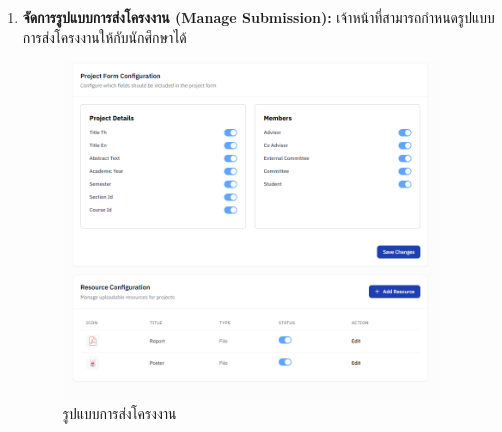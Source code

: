 \begin{itemize}
\begin{enumerate}
    \newpage
    \item \textbf{จัดการรูปแบบการส่งโครงงาน (Manage Submission): } เจ้าหน้าที่สามารถกำหนดรูปแบบการส่งโครงงานให้กับนักศึกษาได้
    \begin{figure}[H]
        \centering
        \includegraphics[width=100mm, keepaspectratio ]{pictures/project_box/project_submission_1.png}
        \caption{รูปแบบการส่งโครงงาน}
    \end{figure}


\end{enumerate}
\end{itemize}
